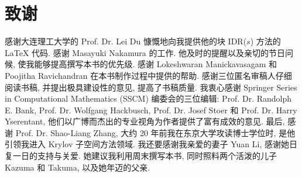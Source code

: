 \section*{{致谢}}\label{sec:acknowledgements}
{感谢大连理工大学的 Prof. Dr. Lei Du 慷慨地向我提供他的块 IDR($s$) 方法的 LaTeX 代码. 感谢 Masayuki Nakamura 的工作. 他及时的提醒以及亲切的节日问候, 使我能够提高撰写本书的优先级. 感谢 Lokeshwaran Manickavasagam 和 Poojitha Ravichandran 在本书制作过程中提供的帮助. 感谢三位匿名审稿人仔细阅读书稿, 并提出极具建设性的意见, 提高了书稿质量. 我衷心感谢 Springer Series in Computational Mathematics (SSCM) 编委会的三位编辑: Prof. Dr. Randolph E. Bank, Prof. Dr. Wolfgang Hackbusch, Prof. Dr. Josef Stoer 和 Prof. Dr. Harry Yserentant, 他们以广博而杰出的专业视角为作者提供了富有成效的意见.}
{最后, 感谢 Prof. Dr. Shao-Liang Zhang, 大约 20 年前我在东京大学攻读博士学位时, 是他引领我进入 Krylov 子空间方法领域. 我还要感谢我亲爱的妻子 Yuan Li, 感谢她日复一日的支持与关爱. 她建议我利用周末撰写本书, 同时照料两个活泼的儿子 Kazuma 和 Takuma, 以及她年迈的父亲.}
\clearpage
